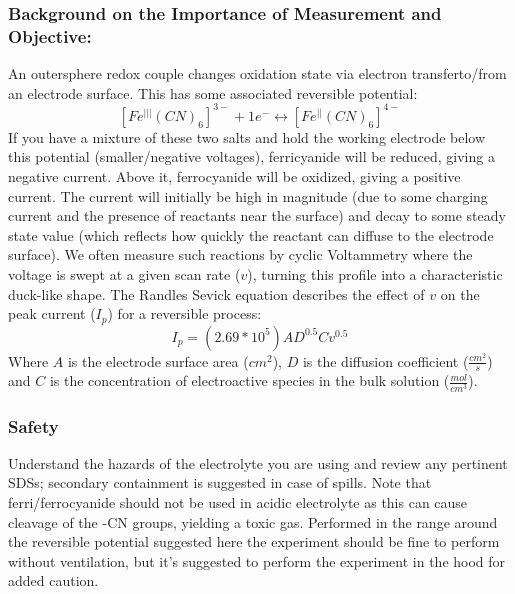 \documentclass{article}
\begin{document}
\subsubsection*{Background on the Importance of Measurement and Objective:}
An outersphere redox couple changes oxidation state via electron transferto/from an electrode surface. This has some associated reversible potential:
\[ [Fe^{|||}(CN)_6]^{3-} + 1e^- \leftrightarrow [Fe^{||}(CN)_6]^{4-}\]
If you have a mixture of these two salts and hold the working electrode below this potential (smaller/negative voltages), ferricyanide will be reduced, giving a negative current. Above it, ferrocyanide will be oxidized, giving a positive current. The current will initially be high in magnitude (due to some charging current and the presence of reactants near the surface) and decay to some steady state value (which reflects how quickly the reactant can diffuse to the electrode surface). We often measure such reactions by cyclic Voltammetry where the voltage is swept at a given scan rate ($v$), turning this profile into a characteristic duck-like shape. The Randles Sevick equation describes the effect of $v$ on the peak current ($I_p$) for a reversible process:
\[ I_p = (2.69*10^5) AD^{0.5}Cv^{0.5}\]
Where $A$ is the electrode surface area ($cm^2$), $D$ is the diffusion coefficient ($\frac{cm^2}{s}$) and $C$ is the concentration of electroactive species in the bulk solution ($\frac{mol}{cm^3}$).
\subsubsection*{Safety}
Understand the hazards of the electrolyte you are using and review any pertinent SDSs; secondary containment is suggested in case of spills. Note that ferri/ferrocyanide should not be used in acidic electrolyte as this can cause cleavage of the -CN groups, yielding a toxic gas. Performed in the range around the reversible potential suggested here the experiment should be fine to perform without ventilation, but it's suggested to perform the experiment in the hood for added caution.
\end{document}
